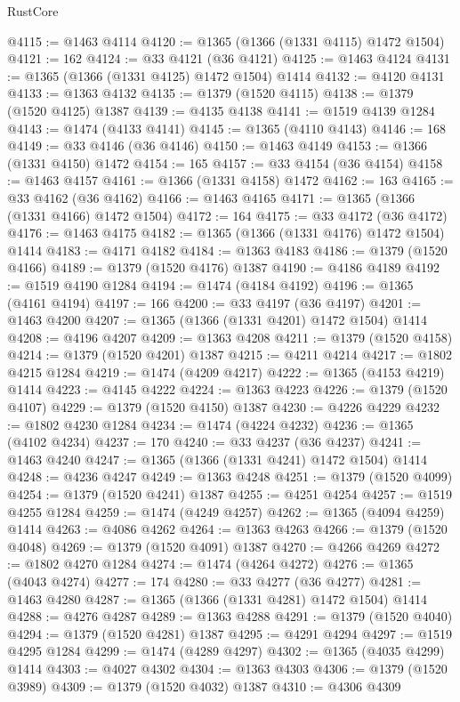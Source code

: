 \begin{lexlean}{RustCore}
\begin{coremodule}
@4115 := @1463 @4114
@4120 := @1365 (@1366 (@1331 @4115) @1472 @1504)
@4121 := 162
@4124 := @33 @4121 (@36 @4121)
@4125 := @1463 @4124
@4131 := @1365 (@1366 (@1331 @4125) @1472 @1504) @1414
@4132 := @4120 @4131
@4133 := @1363 @4132
@4135 := @1379 (@1520 @4115)
@4138 := @1379 (@1520 @4125) @1387
@4139 := @4135 @4138
@4141 := @1519 @4139 @1284
@4143 := @1474 (@4133 @4141)
@4145 := @1365 (@4110 @4143)
@4146 := 168
@4149 := @33 @4146 (@36 @4146)
@4150 := @1463 @4149
@4153 := @1366 (@1331 @4150) @1472
@4154 := 165
@4157 := @33 @4154 (@36 @4154)
@4158 := @1463 @4157
@4161 := @1366 (@1331 @4158) @1472
@4162 := 163
@4165 := @33 @4162 (@36 @4162)
@4166 := @1463 @4165
@4171 := @1365 (@1366 (@1331 @4166) @1472 @1504)
@4172 := 164
@4175 := @33 @4172 (@36 @4172)
@4176 := @1463 @4175
@4182 := @1365 (@1366 (@1331 @4176) @1472 @1504) @1414
@4183 := @4171 @4182
@4184 := @1363 @4183
@4186 := @1379 (@1520 @4166)
@4189 := @1379 (@1520 @4176) @1387
@4190 := @4186 @4189
@4192 := @1519 @4190 @1284
@4194 := @1474 (@4184 @4192)
@4196 := @1365 (@4161 @4194)
@4197 := 166
@4200 := @33 @4197 (@36 @4197)
@4201 := @1463 @4200
@4207 := @1365 (@1366 (@1331 @4201) @1472 @1504) @1414
@4208 := @4196 @4207
@4209 := @1363 @4208
@4211 := @1379 (@1520 @4158)
@4214 := @1379 (@1520 @4201) @1387
@4215 := @4211 @4214
@4217 := @1802 @4215 @1284
@4219 := @1474 (@4209 @4217)
@4222 := @1365 (@4153 @4219) @1414
@4223 := @4145 @4222
@4224 := @1363 @4223
@4226 := @1379 (@1520 @4107)
@4229 := @1379 (@1520 @4150) @1387
@4230 := @4226 @4229
@4232 := @1802 @4230 @1284
@4234 := @1474 (@4224 @4232)
@4236 := @1365 (@4102 @4234)
@4237 := 170
@4240 := @33 @4237 (@36 @4237)
@4241 := @1463 @4240
@4247 := @1365 (@1366 (@1331 @4241) @1472 @1504) @1414
@4248 := @4236 @4247
@4249 := @1363 @4248
@4251 := @1379 (@1520 @4099)
@4254 := @1379 (@1520 @4241) @1387
@4255 := @4251 @4254
@4257 := @1519 @4255 @1284
@4259 := @1474 (@4249 @4257)
@4262 := @1365 (@4094 @4259) @1414
@4263 := @4086 @4262
@4264 := @1363 @4263
@4266 := @1379 (@1520 @4048)
@4269 := @1379 (@1520 @4091) @1387
@4270 := @4266 @4269
@4272 := @1802 @4270 @1284
@4274 := @1474 (@4264 @4272)
@4276 := @1365 (@4043 @4274)
@4277 := 174
@4280 := @33 @4277 (@36 @4277)
@4281 := @1463 @4280
@4287 := @1365 (@1366 (@1331 @4281) @1472 @1504) @1414
@4288 := @4276 @4287
@4289 := @1363 @4288
@4291 := @1379 (@1520 @4040)
@4294 := @1379 (@1520 @4281) @1387
@4295 := @4291 @4294
@4297 := @1519 @4295 @1284
@4299 := @1474 (@4289 @4297)
@4302 := @1365 (@4035 @4299) @1414
@4303 := @4027 @4302
@4304 := @1363 @4303
@4306 := @1379 (@1520 @3989)
@4309 := @1379 (@1520 @4032) @1387
@4310 := @4306 @4309

\end{coremodule}
\end{lexlean}
